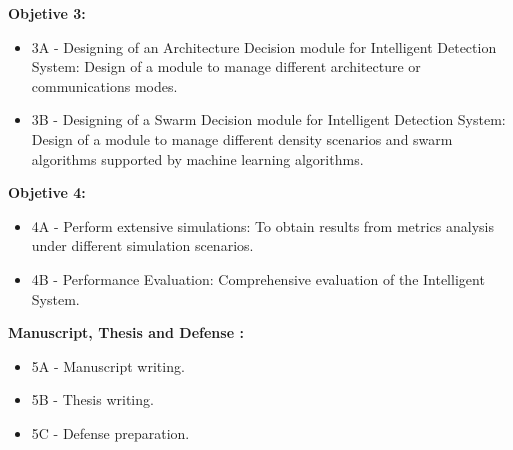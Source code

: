 \hspace{0.5cm}

\textbf{Objetive 3:}
\begin{itemize}
    \item 3A - Designing of an Architecture Decision module for Intelligent Detection System: Design of a module to manage different architecture or communications modes.
    \item 3B - Designing of a Swarm Decision module for Intelligent Detection System: Design of a module to manage different density scenarios and swarm algorithms supported by machine learning algorithms.
\end{itemize}

\hspace{0.5cm}

\textbf{Objetive 4:}
\begin{itemize}
\item 4A - Perform extensive simulations: To obtain results from metrics analysis under different simulation scenarios.
\item 4B - Performance Evaluation: Comprehensive evaluation of the Intelligent System.
\end{itemize}

\hspace{0.5cm}

\textbf{Manuscript, Thesis and Defense :}
\begin{itemize}
\item 5A - Manuscript writing.
\item 5B - Thesis writing.
\item 5C - Defense preparation.
\end{itemize}




